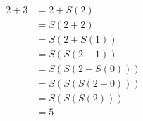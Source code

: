 \documentclass[preview]{standalone}
\begin{document}
\begin{align*}
2 + 3 &= 2 + S(2) \\ &= S(2 + 2) \\ &= S(2 + S(1)) \\ &= S(S(2 + 1)) \\ &= S(S(2 + S(0))) \\ &= S(S(S(2 + 0))) \\ &= S(S(S(2))) \\ &= 5
\end{align*}
\end{document}
